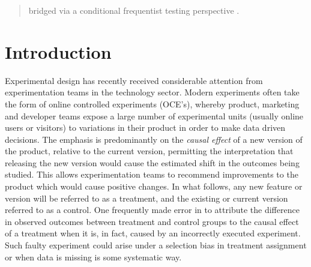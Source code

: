 \documentclass[11pt]{article}
\begin{document}
\begin{abstract}
bridged via a conditional frequentist testing perspective .
\end{abstract}


\section{Introduction}
Experimental design has recently received considerable attention from experimentation teams in the technology sector.
Modern experiments often take the form of online controlled experiments (OCE's), whereby product, marketing and developer teams expose a large number of experimental units (usually online users or visitors) to variations in their product in order to make data driven decisions.
The emphasis is predominantly on the \textit{causal effect} of a new version of the product, relative to the current version, permitting the interpretation that releasing the new version would cause the estimated shift in the outcomes being studied. 
This allows experimentation teams to recommend improvements to the product which would cause positive changes.
In what follows, any new feature or version will be referred to as a treatment, and the existing or current version referred to as a control.
One frequently made error in to attribute the difference in observed outcomes between treatment and control groups to the causal effect of a treatment when it is, in fact, caused by an incorrectly executed experiment. Such faulty experiment could arise under a selection bias in treatment assignment or when data is missing is some systematic way.
\end{document}
